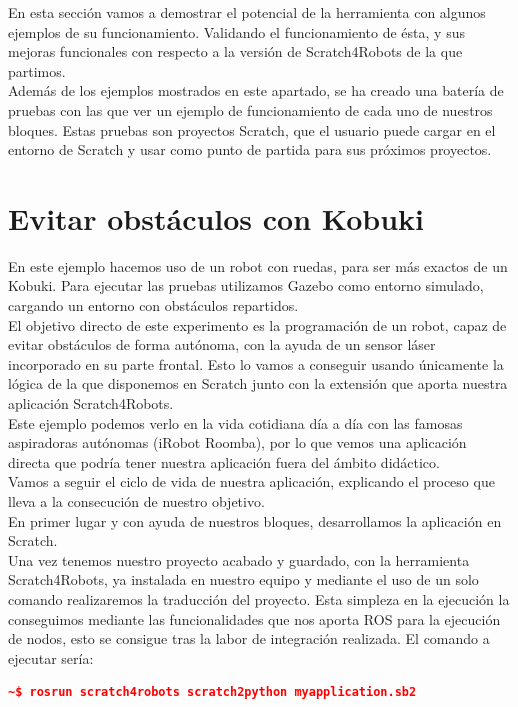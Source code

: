 En esta sección vamos a demostrar el potencial de la herramienta con algunos ejemplos de su funcionamiento. Validando el funcionamiento de ésta, y sus mejoras funcionales con respecto a la versión de Scratch4Robots de la que partimos.\\

Además de los ejemplos mostrados en este apartado, se ha creado una batería de pruebas con las que ver un ejemplo de funcionamiento de cada uno de nuestros bloques. Estas pruebas son proyectos Scratch, que el usuario puede cargar en el entorno de Scratch y usar como punto de partida para sus próximos proyectos.

\section{Evitar obstáculos con Kobuki}
\label{sec:evitar-obstaculos}

En este ejemplo hacemos uso de un robot con ruedas, para ser más exactos de un Kobuki. Para ejecutar las pruebas utilizamos Gazebo como entorno simulado, cargando un entorno con obstáculos repartidos.\\

El objetivo directo de este experimento es la programación de un robot, capaz de evitar obstáculos de forma autónoma, con la ayuda de un sensor láser incorporado en su parte frontal. Esto lo vamos a conseguir usando únicamente la lógica de la que disponemos en Scratch junto con la extensión que aporta nuestra aplicación Scratch4Robots.\\

Este ejemplo podemos verlo en la vida cotidiana día a día con las famosas aspiradoras autónomas (iRobot Roomba), por lo que vemos una aplicación directa que podría tener nuestra aplicación fuera del ámbito didáctico.\\

Vamos a seguir el ciclo de vida de nuestra aplicación, explicando el proceso que lleva a la consecución de nuestro objetivo.\\

En primer lugar y con ayuda de nuestros bloques, desarrollamos la aplicación en Scratch.\\

Una vez tenemos nuestro proyecto acabado y guardado, con la herramienta Scratch4Robots, ya instalada en nuestro equipo y mediante el uso de un solo comando realizaremos la traducción del proyecto. Esta simpleza en la ejecución la conseguimos mediante las funcionalidades que nos aporta ROS para la ejecución de nodos, esto se consigue tras la labor de integración realizada. El comando a ejecutar sería:\\
\begin{lstlisting}[language=json,firstnumber=1]
~$ rosrun scratch4robots scratch2python myapplication.sb2
\end{lstlisting}

